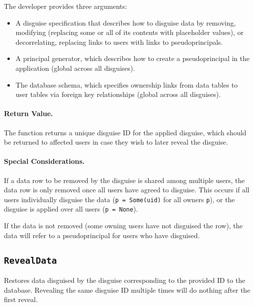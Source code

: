     The developer provides three arguments:
    \begin{itemize}[nosep]
    \item A disguise specification that describes how to disguise data by
    removing, modifying (replacing some or all of its contents with placeholder
    values), or decorrelating, replacing links to users with links to
    pseudoprincipals.
    
    \item A principal generator, which describes how to create a
    pseudoprincipal in the application (global across all disguises).
    
    \item The database schema, which specifies ownership links from data tables to user
    tables via foreign key relationships (global across all disguises).
    \end{itemize}

    \paragraph{Return Value.} 
    The function returns a unique disguise ID for the applied disguise, which
    should be returned to affected users in case they wish to later reveal the
    disguise.

    \paragraph{Special Considerations.}
    If a data row to be removed by the disguise is shared among multiple users,
    the data row is only removed once all users have agreed to disguise. This
    occurs if \one{} all users individually disguise the data (\texttt{p =
    Some(uid)} for all owners \texttt{p}), or \two{} the disguise is applied
    over all users (\texttt{p = None}).
   
    If the data is not removed (some owning users have not disguised the row),
    the data will refer to a pseudoprincipal for users who have disguised.


\subsection{\texttt{RevealData}}

    Restores data disguised by the disguise corresponding to the provided ID to
    the database.
    Revealing the same disguise ID multiple times will do nothing after the
    first reveal.

